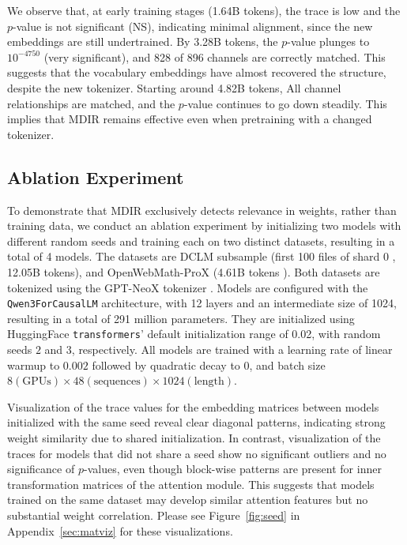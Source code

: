 \documentclass{article} %
\begin{document}
We observe that, at early training stages (1.64B tokens), the trace is low and the $p$-value is not significant (NS), indicating minimal alignment, since the new embeddings are still undertrained. By 3.28B tokens, the $p$-value plunges to $10^{-4750}$ (very significant), and 828 of 896 channels are correctly matched. This suggests that the vocabulary embeddings have almost recovered the structure, despite the new tokenizer. Starting around 4.82B tokens, All channel relationships are matched, and the $p$-value continues to go down steadily. This implies that MDIR remains effective even when pretraining with a changed tokenizer.


\subsection{Ablation Experiment}
To demonstrate that MDIR exclusively detects relevance in weights, rather than training data, we conduct an ablation experiment by initializing two models with different random seeds and training each on two distinct datasets, resulting in a total of 4 models.
The datasets are DCLM subsample \citep{li2025datacomplmsearchgenerationtraining} (first 100 files of shard 0 \citep{dclm_baseline_shard_2024}, 12.05B tokens), and OpenWebMath-ProX \citep{zhou2025programmingexampleliftingpretraining} (4.61B tokens \citep{owm_prox_2024}).
Both datasets are tokenized using the GPT-NeoX tokenizer \citep{black-etal-2022-gpt}.  
Models are configured with the \texttt{Qwen3ForCausalLM} \citep{huggingface_qwen3_impl} architecture, with 12 layers and an intermediate size of 1024,  
resulting in a total of 291 million parameters.  
They are initialized using HuggingFace \texttt{transformers}' default initialization range of 0.02, 
with random seeds $2$ and $3$, respectively.  
All models are trained with a learning rate of linear warmup to $0.002$ followed by quadratic decay to $0$,  
and batch size $8 (\text{GPUs}) \times 48 (\text{sequences}) \times 1024 (\text{length})$.

Visualization of the trace values for the embedding matrices between models initialized with the same seed reveal clear diagonal patterns,  
indicating strong weight similarity due to shared initialization.  
In contrast, visualization of the traces for models that did not share a seed show no significant outliers and no significance of $p$-values,
even though block-wise patterns are present for inner transformation matrices of the attention module.
This suggests that models trained on the same dataset may develop similar attention features but no substantial weight correlation.  Please see Figure~\ref{fig:seed} in Appendix~\ref{sec:matviz} for these visualizations.
\end{document}
